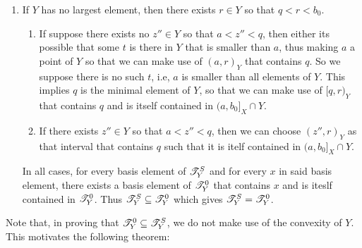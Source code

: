 \documentclass[main.tex]{subfiles}
\begin{document}
{\begin{enumerate}
    \item If $Y$ has no largest element, then there exists $r\in Y$ so that $q<r<b_0$. \begin{enumerate}
        \item If suppose there exists no $z'' \in Y$ so that $a<z''<q$, then either its possible that some $t$ is there in $Y$ that is smaller than $a$, thus making $a$ a point of $Y$ so that we can make use of $(a,r)_Y$ that contains $q$. So we suppose there is no such $t$, i.e, $a$ is smaller than all elements of $Y$. This implies $q$ is the minimal element of $Y$, so that we can make use of $[q,r)_Y$ that contains $q$ and is itself contained in $(a,b_0]_X \cap Y$.
        \item If there exists $z'' \in Y$ so that $a<z''<q$, then we can choose $(z'',r)_Y$ as that interval that contains $q$ such that it is itelf contained in $(a,b_0]_X \cap Y$.
    \end{enumerate} 
In all cases, for every basis element of $\mathscr T^S_Y$ and for every $x$ in said basis element, there exists a basis element of $\mathscr T^0_Y$ that contains $x$ and is iteslf contained in $\mathscr T^0_Y$. Thus $\mathscr T^S_Y \subseteq \mathscr T^0_Y$ which gives $\mathscr T^S_Y=\mathscr T^0_Y$.
\end{enumerate}
} 
Note that, in proving that $\mathscr T^0_Y \subseteq \mathscr T^S_Y$, we do not make use of the convexity of $Y$. This motivates the following theorem:
\end{document}
